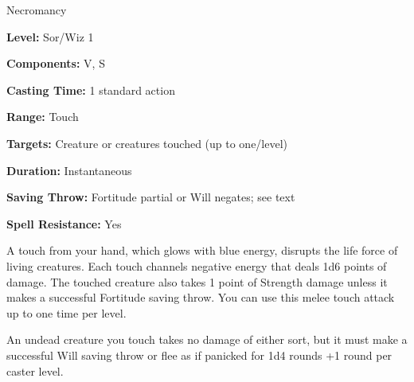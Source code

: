 
Necromancy

\textbf{Level:} Sor/Wiz 1

\textbf{Components:} V, S

\textbf{Casting Time:} 1 standard action

\textbf{Range:} Touch

\textbf{Targets:} Creature or creatures touched (up to one/level)

\textbf{Duration:} Instantaneous

\textbf{Saving Throw:} Fortitude partial or Will negates; see text

\textbf{Spell Resistance:} Yes

A touch from your hand, which glows with blue energy, disrupts the life force of 
living creatures. Each touch channels negative energy that deals 1d6 points of 
damage. The touched creature also takes 1 point of Strength damage unless it makes 
a successful Fortitude saving throw. You can use this melee touch attack up to 
one time per level.

An undead creature you touch takes no damage of either sort, but it must make a 
successful Will saving throw or flee as if panicked for 1d4 rounds +1 round per 
caster level.

